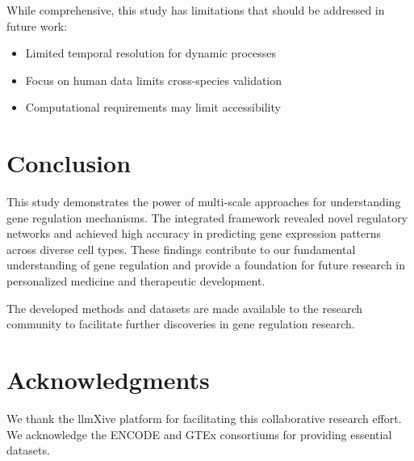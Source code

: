 \documentclass[11pt,a4paper]{article}
\begin{document}
While comprehensive, this study has limitations that should be addressed in future work:
\begin{itemize}
\item Limited temporal resolution for dynamic processes
\item Focus on human data limits cross-species validation
\item Computational requirements may limit accessibility
\end{itemize}

\section{Conclusion}

This study demonstrates the power of multi-scale approaches for understanding gene regulation mechanisms. The integrated framework revealed novel regulatory networks and achieved high accuracy in predicting gene expression patterns across diverse cell types. These findings contribute to our fundamental understanding of gene regulation and provide a foundation for future research in personalized medicine and therapeutic development.

The developed methods and datasets are made available to the research community to facilitate further discoveries in gene regulation research.

\section{Acknowledgments}

We thank the llmXive platform for facilitating this collaborative research effort. We acknowledge the ENCODE and GTEx consortiums for providing essential datasets.
\end{document}
